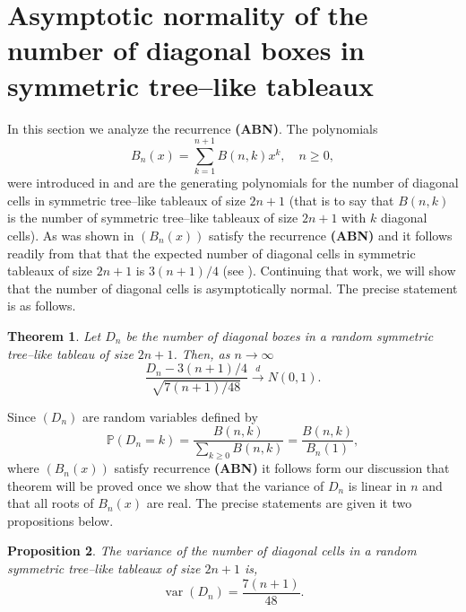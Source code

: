 \documentclass[10pt]{amsart}
\newtheorem{theorem}{Theorem}
\newtheorem{proposition}[theorem]{Proposition}
\numberwithin{subcase}{case}
\begin{document}
\section{Asymptotic normality of the number of diagonal boxes in symmetric tree--like tableaux}
In this section we analyze the recurrence {\bf(ABN)}. The  polynomials 
\[B_{n}(x)=\sum_{k=1}^{n+1}B(n,k)x^k,\quad n\ge0,\] 
were introduced in \cite[Section~3.2]{ABN} and are the generating polynomials for the number of diagonal cells in symmetric tree--like tableaux of size $2n+1$  (that is to say that $B(n,k)$ is the number of symmetric tree--like tableaux of size $2n+1$ with $k$ diagonal cells). As was shown  in \cite{ABN}  $(B_n(x))$ satisfy the recurrence {\bf(ABN)} and it follows readily from that that the expected number of diagonal cells  in  symmetric tableaux of size $2n+1$ is $3(n+1)/4$ (see \cite[Proposition~19]{ABN}). Continuing that work, we will show that the number 
of diagonal cells is asymptotically normal. The precise statement is as follows. 
\begin{theorem}\label{thm:clt} Let $D_n$ be the number of diagonal boxes in a random symmetric tree--like tableau of size $2n+1$. Then, as $n\to\infty$
\[\frac{D_n-3(n+1)/4}{\sqrt{7(n+1)/48}}\stackrel d\longrightarrow N(0,1).\]
\end{theorem}
Since $(D_n)$ are random variables defined by 
\[{\mathbb{P}}(D_n=k)=\frac{B(n,k)}{\sum_{k\geq0}B(n,k)}=\frac{B(n,k)}{B_{n}(1)},\]
where $(B_n(x))$ satisfy recurrence {\bf(ABN)} it follows form our discussion that theorem will be proved once we show that the variance of $D_n$ is 
linear in $n$ and that all roots of $B_n(x)$ are real.  The precise statements are given it two propositions below.
\begin{proposition}\label{prop:var}
The variance of the number of diagonal cells in a random symmetric tree--like tableaux of size $2n+1$ is,
\begin{equation}\label{var_expl}
{\operatorname{var}}(D_n)=\frac{7(n+1)}{48}.
\end{equation}
\end{proposition}
\end{document}
